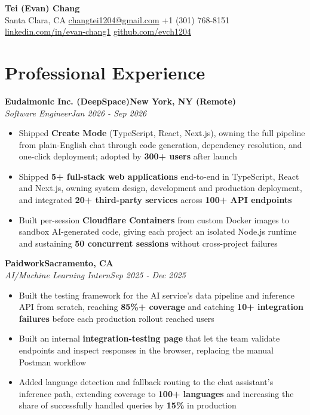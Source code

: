 \documentclass[letterpaper,11pt]{article}
\newcommand{\jobentry}[4]{%
  \textbf{#1}\hfill\textbf{#2}\\
  \textit{#3}\hfill\textit{#4}\par\vspace{1pt}}
\newcommand{\entrygap}{\vspace{4pt}}
\begin{document}
\begin{center}
  {\fontsize{22pt}{24pt}\selectfont\textbf{Tei (Evan) Chang}}\\[3pt]
  Santa Clara, CA \textbullet{} \href{mailto:changtei1204@gmail.com}{changtei1204@gmail.com} \textbullet{} +1 (301) 768-8151 \textbullet{} \href{https://linkedin.com/in/evan-chang1}{linkedin.com/in/evan-chang1} \textbullet{} \href{https://github.com/evch1204}{github.com/evch1204}
\end{center}

\section{Professional Experience}

\jobentry{Eudaimonic Inc. (DeepSpace)}{New York, NY (Remote)}{Software Engineer}{Jan 2026 - Sep 2026}
\begin{itemize}
  \item Shipped \textbf{Create Mode} (TypeScript, React, Next.js), owning the full pipeline from plain-English chat through code generation, dependency resolution, and one-click deployment; adopted by \textbf{300+ users} after launch
  \item Shipped \textbf{5+ full-stack web applications} end-to-end in TypeScript, React and Next.js, owning system design, development and production deployment, and integrated \textbf{20+ third-party services} across \textbf{100+ API endpoints}
  \item Built per-session \textbf{Cloudflare Containers} from custom Docker images to sandbox AI-generated code, giving each project an isolated Node.js runtime and sustaining \textbf{50 concurrent sessions} without cross-project failures
\end{itemize}
\entrygap

\jobentry{Paidwork}{Sacramento, CA}{AI/Machine Learning Intern}{Sep 2025 - Dec 2025}
\begin{itemize}
  \item Built the testing framework for the AI service's data pipeline and inference API from scratch, reaching \textbf{85\%+ coverage} and catching \textbf{10+ integration failures} before each production rollout reached users
  \item Built an internal \textbf{integration-testing page} that let the team validate endpoints and inspect responses in the browser, replacing the manual Postman workflow
  \item Added language detection and fallback routing to the chat assistant's inference path, extending coverage to \textbf{100+ languages} and increasing the share of successfully handled queries by \textbf{15\%} in production
\end{itemize}
\entrygap
\end{document}
